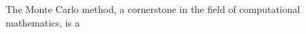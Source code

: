 \documentclass[12pt]{amsart}
\begin{document}
                                                                                                                                                                                                                                                                                                                                                                                                                                                                                                                                                                                                                                                                                                                                                                                                                                                                                                                                                                                                                                                                                                                                                                                                                                                                                                                                                                                                                                                                                                                                                                                                                                                                                                                                                                                                                                                                                                                                                                                                                                                                                                                                                                                                                                                                                                                                                                                                                                                                                                                                                                                                                                                                                                                                                                                                                                                                                                                                                                                                                                                                                                                                                                                                                                                                                                                                                                                 The Monte Carlo method, a cornerstone in the field of computational mathematics, is a 
\end{document}
